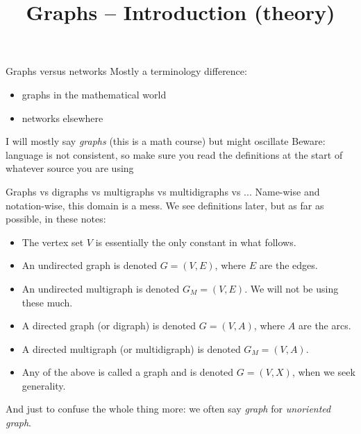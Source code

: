 \documentclass[aspectratio=169]{beamer}
\title{Graphs -- Introduction (theory)}
\date{}
\begin{document}
\begin{frame}
	\titlepage
\end{frame}

\stretchon



\begin{frame}{Graphs versus networks}
	Mostly a terminology difference:
	\begin{itemize}
	\item graphs in the mathematical world
	\item networks elsewhere
	\end{itemize}
	\vfill
	I will mostly say \emph{graphs} (this is a math course) but might oscillate
	\vfill
	Beware: language is not consistent, so make sure you read the definitions at the start of whatever source you are using
\end{frame}

\begin{frame}{Graphs vs digraphs vs multigraphs vs multidigraphs vs ...}
	Name-wise and notation-wise, this domain is a mess. We see definitions later, but as far as possible, in these notes:
	\begin{itemize}
		\item The vertex set $V$ is essentially the only constant in what follows.
		\item An undirected graph is denoted $G=(V,E)$, where $E$ are the edges.
		\item An undirected multigraph is denoted $G_M=(V,E)$. We will not be using these much.
		\item A directed graph (or digraph) is denoted $G=(V,A)$, where $A$ are the arcs.
		\item A directed multigraph (or multidigraph) is denoted $G_M=(V,A)$.
		\item Any of the above is called a graph and is denoted $G=(V,X)$, when we seek generality.
	\end{itemize}
And just to confuse the whole thing more: we often say \emph{graph} for \emph{unoriented graph}.
\end{frame}
\end{document}
